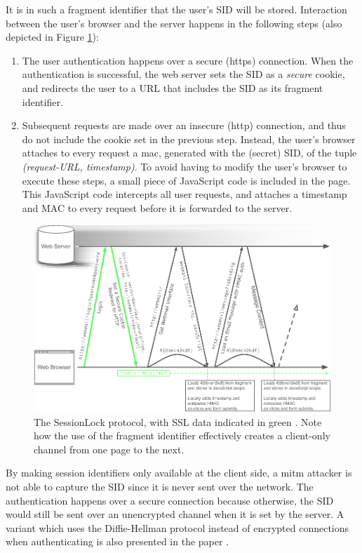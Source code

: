 It is in such a fragment identifier that the user's SID will be stored. Interaction between the user's browser and the server happens in the following steps (also depicted in Figure \ref{fig:sessionlock}):
\begin{enumerate}
	\item The user authentication happens over a secure (\gls{https}) connection. When the authentication is successful, the web server sets the SID as a \emph{secure} cookie, and redirects the user to a URL that includes the SID as its fragment identifier.
	\item Subsequent requests are made over an insecure (\gls{http}) connection, and thus do not include the cookie set in the previous step. Instead, the user's browser attaches to every request a \gls{mac}, generated with the (secret) SID, of the tuple \emph{(request-URL, timestamp)}. To avoid having to modify the user's browser to execute these steps, a small piece of JavaScript code is included in the page. This JavaScript code intercepts all user requests, and attaches a timestamp and MAC to every request before it is forwarded to the server.
\end{enumerate}

\begin{figure}[htb]
	\centering
	\includegraphics[width=\textwidth]{img/sessionlock.png}
	\caption[The SessionLock protocol]{The SessionLock protocol, with SSL data indicated in green \cite{Adida2008}. Note how the use of the fragment identifier effectively creates a client-only channel from one page to the next.}
	\label{fig:sessionlock}
\end{figure}

By making session identifiers only available at the client side, a \gls{mitm} attacker is not able to capture the SID since it is never sent over the network. The authentication happens over a secure connection because otherwise, the SID would still be sent over an unencrypted channel when it is set by the server. A variant which uses the Diffie-Hellman protocol \cite{Diffie1976} instead of encrypted connections when authenticating is also presented in the paper \cite{Adida2008}.

